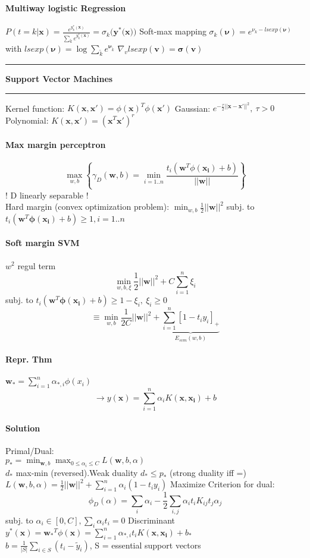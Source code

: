 \documentclass[7pt]{scrartcl}
\newlength{\secskip}
\renewcommand{\section}[1]{
  \hrule\vspace{.1em}
  \textbf{#1}
  \hrule
}
\renewcommand{\vec}{\mathbf}
\begin{document}
\begin{multicols}{4}
\paragraph{Multiway logistic Regression}
$P(t=k|\vec{x}) = \frac{e^{y_k^*(\vec{x})}}{\sum_{\tilde{k}}e^{y_{\tilde{k}}^*(\vec{x})}} = \sigma_k(\vec{y}^*(\vec{x))}$
Soft-max mapping $\sigma_k(\vec{\nu}) = e^{\nu_k - lsexp(\vec{\nu})}$ with $lsexp(\vec{\nu}) = \log \sum_{\tilde{k}}e^{\vec{\nu}_{\tilde{k}}}$
$\nabla_v lsexp(\vec v) = \vec \sigma(\vec v)$

\section{Support Vector Machines}
Kernel function: $K(\vec x, \vec x') = \phi(\vec x)^T\phi(\vec x')$
Gaussian: $e^{-\frac{\tau}{2}||\vec{x}-\vec{x'}||^2}, ~ \tau >0$\\
Polynomial: $K(\vec x,\vec x') = (\vec x^T\vec x')^r$
\paragraph{Max margin perceptron}
\[\max_{w,b} \left\{ \gamma_D(\vec{w},b) = \min_{i=1..n} \frac{t_i(\vec{w}^T \phi(\vec{x_i}) + b)}{||\vec{w}||} \right\}\]
! D linearly separable ! \\
Hard margin (convex optimization problem): $\min_{w,b} \frac{1}{2}||\vec w||^2$ subj. to $t_i(\vec w^T \vec{\phi(x_i)} + b) \geq 1, i=1..n$
\paragraph{Soft margin SVM} $w^2$ regul term
\[\min_{w,b,\xi} \frac{1}{2}||\vec{w}||^2 + C \sum_{i=1}^n \xi_i\]
subj. to $t_i(\vec{w}^T \vec{\phi(x_i)} + b) \geq 1-\xi_i,~ \xi_i \geq 0$
\[\equiv \min_{w,b} \frac{1}{2C}||\vec{w}||^2 + \underbrace{\sum_{i=1}^n [1-t_iy_i]_+}_{E_{svm}(w,b)}\]
\paragraph{Repr. Thm}
$\vec{w_*} = \sum_{i=1}^n \alpha_{*,i} \phi(x_i)$
\[\rightarrow y(\vec{x}) = \sum_{i=1}^n \alpha_i K(\vec{x},\vec{x_i})+b\]
\paragraph{Solution}
Primal/Dual: \\
$p_* = \min_{\vec{w},b} \max_{0 \leq \alpha_i \leq C} L(\vec{w},b,\alpha)$\\
$d_*$ max-min (reversed).Weak duality $d_* \leq p_*$ (strong duality iff =)\\
$L(\vec{w},b,\alpha) = \frac{1}{2}||\vec{w}||^2 + \sum_{i=1}^n \alpha_i(1-t_iy_i)$
Maximize Criterion for dual:
\[\phi_D(\alpha) = \sum_i \alpha_i - \frac{1}{2} \sum_{i,j} \alpha_i t_i K_{ij} t_j \alpha_j\] subj. to $\alpha_i \in [0,C], \sum_i \alpha_it_i = 0$
Discriminant $y^*(\vec{x}) = \vec{w_*}^T \phi(\vec{x}) = \sum_{i=1}^n \alpha_{*,i} t_i K(\vec{x},\vec{x_i}) + b_*$\\
$b = \frac{1}{|S|} \sum_{i \in S} (t_i - \tilde{y}_i)$, S = essential support vectors

\end{multicols}
\end{document}
